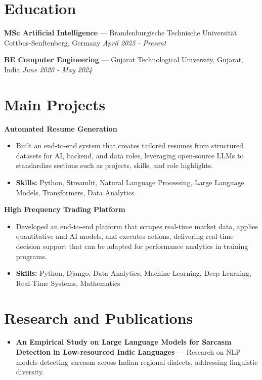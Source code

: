\documentclass[a4paper,10pt]{article}
\begin{document}
\section*{Education}
\textbf{MSc Artificial Intelligence} — Brandenburgische Technische Universität Cottbus-Senftenberg, Germany \hfill \textit{April 2025 - Present}\par
\vspace{1.5pt}
\textbf{BE Computer Engineering} — Gujarat Technological University, Gujarat, India \hfill \textit{June 2020 - May 2024}\par

\section*{Main Projects}
\textbf{Automated Resume Generation}\par
\vspace{1pt}
\begin{itemize}
  \item Built an end-to-end system that creates tailored resumes from structured datasets for AI, backend, and data roles, leveraging open-source LLMs to standardize sections such as projects, skills, and role highlights.
  \item \textbf{Skills:} Python, Streamlit, Natural Language Processing, Large Language Models, Transformers, Data Analytics
\end{itemize}
\vspace{3pt}
\textbf{High Frequency Trading Platform}\par
\vspace{1pt}
\begin{itemize}
  \item Developed an end-to-end platform that scrapes real-time market data, applies quantitative and AI models, and executes actions, delivering real-time decision support that can be adapted for performance analytics in training programs.
  \item \textbf{Skills:} Python, Django, Data Analytics, Machine Learning, Deep Learning, Real-Time Systems, Mathematics
\end{itemize}

\section*{Research and Publications}
\begin{itemize}
\item \textbf{An Empirical Study on Large Language Models for Sarcasm Detection in Low-resourced Indic Languages} — Research on NLP models detecting sarcasm across Indian regional dialects, addressing linguistic diversity.
\end{itemize}
\end{document}
